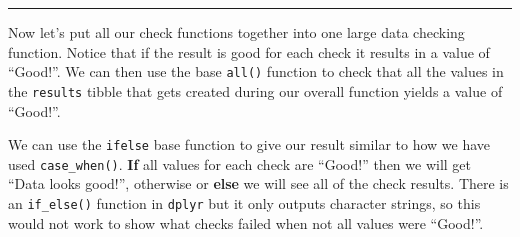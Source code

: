 \documentclass[
]{article}
\begin{document}
\begin{center}\rule{0.5\linewidth}{0.5pt}\end{center}

Now let's put all our check functions together into one large data
checking function. Notice that if the result is good for each check it
results in a value of ``Good!''. We can then use the base \texttt{all()}
function to check that all the values in the \texttt{results} tibble
that gets created during our overall function yields a value of
``Good!''.

We can use the \texttt{ifelse} base function to give our result similar
to how we have used \texttt{case\_when()}. \textbf{If} all values for
each check are ``Good!'' then we will get ``Data looks good!'',
otherwise or \textbf{else} we will see all of the check results. There
is an \texttt{if\_else()} function in \texttt{dplyr} but it only outputs
character strings, so this would not work to show what checks failed
when not all values were ``Good!''.
\end{document}
